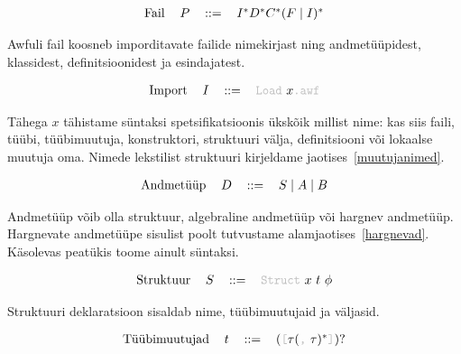 \documentclass[12pt]{article}
\begin{document}
      \begin{equation*}
        \begin{tabular}{llll}
          Fail & $P$ & $::=$ & $I^*D^*C^*(F\mid I)^*$
        \end{tabular}
      \end{equation*}

      Awfuli fail koosneb imporditavate failide nimekirjast ning andmetüüpidest, klassidest, definitsioonidest ja esindajatest.

      \begin{equation*}
        \begin{tabular}{llll}
          Import & $I$ & $::=$ & {\color{helehall}\verb!Load!} $x${\color{helehall}\verb!.awf!}
        \end{tabular}
      \end{equation*}

      Tähega $x$ tähistame süntaksi spetsifikatsioonis ükskõik millist nime: kas siis faili, tüübi, tüübimuutuja, konstruktori, struktuuri välja, definitsiooni või lokaalse muutuja oma. Nimede lekstilist struktuuri kirjeldame jaotises~\ref{muutujanimed}.

      \begin{equation*}
        \begin{tabular}{llll}
          Andmetüüp & $D$ & $::=$ & $S\mid A\mid B$
        \end{tabular}
      \end{equation*}

      Andmetüüp võib olla struktuur, algebraline andmetüüp või hargnev andmetüüp. Hargnevate andmetüüpe sisulist poolt tutvustame alamjaotises~\ref{hargnevad}. Käsolevas peatükis toome ainult süntaksi.

      \begin{equation*}
        \begin{tabular}{llll}
          Struktuur & $S$ & $::=$ & {\color{helehall}\verb!Struct!} $x$ $t$ $\phi$
        \end{tabular}
      \end{equation*}

      Struktuuri deklaratsioon sisaldab nime, tüübimuutujaid ja väljasid.

      \begin{equation*}
        \begin{tabular}{llll}
          Tüübimuutujad & $t$ & $::=$ & $(${\color{helehall}\verb![!}$\tau(${\color{helehall}\verb!,!} $\tau)^*${\color{helehall}\verb!]!}$)?$
        \end{tabular}
      \end{equation*}
\end{document}
